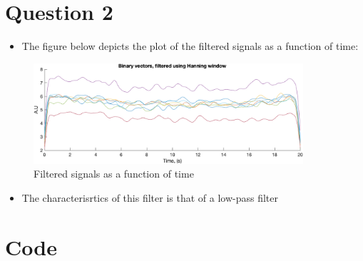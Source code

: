 \documentclass[a4paper, 12pt]{article}
\begin{document}
\newpage
\section*{Question 2}
  \begin{itemize}
    \item The figure below depicts the plot of the filtered signals as a function of time:
  \end{itemize}
  \begin{figure}[H]
    \centering
    \includegraphics[width= 10cm]{filtered.png}
    \caption{Filtered signals as a function of time}
  \end{figure}
  \begin{itemize}
    \item The characterisrtics of this filter is that of a low-pass filter
  \end{itemize}
\newpage
{}
\section{Code}
    
\end{document}

